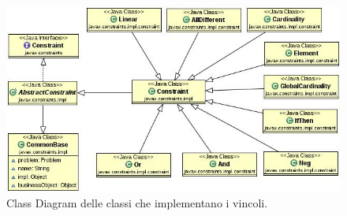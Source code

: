 \begin{figure}[!ht]\label{constraintsUML}
\centering
\includegraphics[scale=.5]{img/Constraints.JPG}
\caption{Class Diagram delle classi che implementano i vincoli.}
\end{figure}
